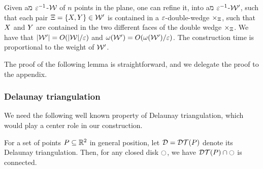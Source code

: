 \documentclass[12pt]{article}%
\begin{document}
\SaveContent{\LemmaRefineDWBody}%
{%
    Given aמ $\varepsilon^{-1}$-\SSPD $\mathcal{W}$ of $n$ points in the plane, one
    can refine it, into aמ $\varepsilon^{-1}$-\SSPD $\mathcal{W}'$, such that each
    pair $\Xi = \{ X, Y \} \in \mathcal{W}'$ is contained in a
    $\varepsilon$-double-wedge $\times_\Xi$, such that $X$ and $Y$ are
    contained in the two different faces of the double wedge
    $\times_\Xi$. We have that $|\mathcal{W}'| = O(|\mathcal{W}|/\varepsilon)$ and
    $\WeightX{\WS'} = O(\WeightX{\WS'}/\eps)$. The construction time
    is proportional to the weight of $\mathcal{W}'$.
}

The proof of the following lemma is straightforward, and we delegate
the proof to the appendix.
\begin{lemma}
    \LemmaRefineDWBody{}
\end{lemma}



\subsubsection{Delaunay triangulation}

We need the following well known property of Delaunay triangulation,
which would play a center role in our construction.

\begin{claim}
    For a set of points $P \subseteq \mathbb{R}^2$ in general position, let
    $\DT = \DTX{\PS}$ denote its Delaunay triangulation.  Then, for
    any closed disk $\ocircle$, we have $\restrictY{\DTX{\PS}}{\disk}$ is
    connected.
\end{claim}
\end{document}

